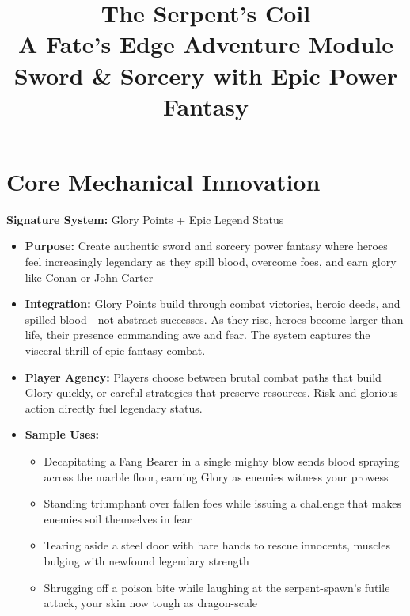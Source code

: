 \documentclass[11pt]{article}
\title{\Huge\textbf{The Serpent's Coil}\\
\Large A Fate's Edge Adventure Module\\
\large Sword \& Sorcery with Epic Power Fantasy}
\author{}
\date{}
\begin{document}
\maketitle

\section{Core Mechanical Innovation}

\textbf{Signature System:} Glory Points + Epic Legend Status
\begin{itemize}
\item \textbf{Purpose:} Create authentic sword and sorcery power fantasy where heroes feel increasingly legendary as they spill blood, overcome foes, and earn glory like Conan or John Carter
\item \textbf{Integration:} Glory Points build through combat victories, heroic deeds, and spilled blood—not abstract successes. As they rise, heroes become larger than life, their presence commanding awe and fear. The system captures the visceral thrill of epic fantasy combat.
\item \textbf{Player Agency:} Players choose between brutal combat paths that build Glory quickly, or careful strategies that preserve resources. Risk and glorious action directly fuel legendary status.
\item \textbf{Sample Uses:}
  \begin{itemize}
  \item Decapitating a Fang Bearer in a single mighty blow sends blood spraying across the marble floor, earning Glory as enemies witness your prowess
  \item Standing triumphant over fallen foes while issuing a challenge that makes enemies soil themselves in fear
  \item Tearing aside a steel door with bare hands to rescue innocents, muscles bulging with newfound legendary strength
  \item Shrugging off a poison bite while laughing at the serpent-spawn's futile attack, your skin now tough as dragon-scale
  \end{itemize}
\end{itemize}
\end{document}
